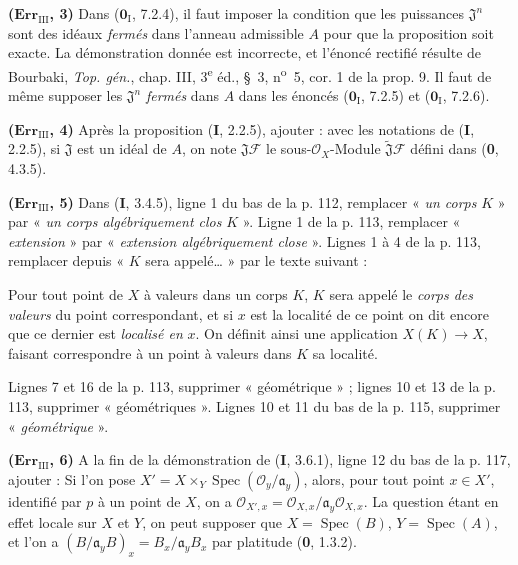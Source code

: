 \noindent\textbf{($\mathbf{Err}_{\mathrm{III}}$, 3)} Dans
($\mathbf{0}_{\mathrm I}$, 7.2.4), il faut imposer la condition que les puissances
$\mathfrak J^n$ sont des idéaux \emph{fermés} dans l'anneau admissible $A$ pour
que la proposition soit exacte. La démonstration donnée est incorrecte, et
l'énoncé rectifié résulte de Bourbaki, \emph{Top. gén.}, chap. III,
3\textsuperscript{e} éd., \S~3, n\textsuperscript{o}~5, cor. 1 de la prop. 9.
Il faut de même supposer les $\mathfrak J^n$ \emph{fermés} dans $A$ dans les
énoncés ($\mathbf{0}_{\mathrm I}$, 7.2.5) et ($\mathbf{0}_{\mathrm I}$, 7.2.6).

\noindent\textbf{($\mathbf{Err}_{\mathrm{III}}$, 4)} Après la proposition
(\textbf{I}, 2.2.5), ajouter : avec les notations de (\textbf{I}, 2.2.5), si $\mathfrak J$ est un
idéal de $A$, on note $\mathfrak J\mathscr F$ le sous-$\mathscr O_X$-Module
$\widetilde{\mathfrak J}\mathscr F$ défini dans (\textbf{0}, 4.3.5).

\noindent\textbf{($\mathbf{Err}_{\mathrm{III}}$, 5)} Dans (\textbf{I}, 3.4.5), ligne 1
du bas de la p. 112, remplacer « \emph{un corps} $K$ » par « \emph{un corps
algébriquement clos} $K$ ». Ligne 1 de la p. 113, remplacer « \emph{extension} »
par « \emph{extension algébriquement close} ». Lignes 1 à 4 de la p. 113,
remplacer depuis « $K$ sera appelé\ldots{} » par le texte suivant :

Pour tout point de $X$ à valeurs dans un corps $K$, $K$ sera appelé le
\emph{corps des valeurs} du point correspondant, et si $x$ est la localité de
ce point on dit encore que ce dernier est \emph{localisé en} $x$. On définit
ainsi une application $X(K)\to X$, faisant correspondre à un point à valeurs
dans $K$ sa localité.

Lignes 7 et 16 de la p. 113, supprimer « géométrique » ; lignes 10 et 13 de
la p. 113, supprimer « géométriques ». Lignes 10 et 11 du bas de la p. 115,
supprimer « \emph{géométrique} ».

\noindent\textbf{($\mathbf{Err}_{\mathrm{III}}$, 6)} A la fin de la
démonstration de (\textbf{I}, 3.6.1), ligne 12 du bas de la p. 117, ajouter : Si l'on
pose
$X'=X\times_Y\operatorname{Spec}(\mathscr O_y/\mathfrak a_y)$, alors, pour tout
point $x\in X'$, identifié par $p$ à un point de $X$, on a
$\mathscr O_{X',x}=\mathscr O_{X,x}/\mathfrak a_y\mathscr O_{X,x}$. La question
étant en effet locale sur $X$ et $Y$, on peut supposer que
$X=\operatorname{Spec}(B)$, $Y=\operatorname{Spec}(A)$, et l'on a
$(B/\mathfrak a_yB)_x=B_x/\mathfrak a_yB_x$ par platitude (\textbf{0}, 1.3.2).

